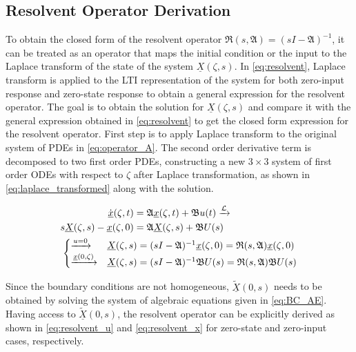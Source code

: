 \subsection{Resolvent Operator Derivation} \label{app:resolvent}
To obtain the closed form of the resolvent operator $\mathfrak{R}(s, \mathfrak{A}) = (sI-\mathfrak{A})^{-1}$, it can be treated as an operator that maps the initial condition or the input to the Laplace transform of the state of the system $\underline{X}(\zeta, s)$. In \eqref{eq:resolvent}, Laplace transform is applied to the LTI representation of the system for both zero-input response and zero-state response to obtain a general expression for the resolvent operator. The goal is to obtain the solution for $\underline{X}(\zeta, s)$ and compare it with the general expression obtained in \eqref{eq:resolvent} to get the closed form expression for the resolvent operator. First step is to apply Laplace transform to the original system of PDEs in \eqref{eq:operator_A}. The second order derivative term is decomposed to two first order PDEs, constructing a new $3 \times 3$ system of first order ODEs with respect to $\zeta$ after Laplace transformation, as shown in \eqref{eq:laplace_transformed} along with the solution.

\begin{equation} \label{eq:resolvent}
    \begin{aligned}
        \dot{\underline{x}}(\zeta, t) &= \mathfrak{A} \underline{x}(\zeta, t) + \mathfrak{B} u(t) \xrightarrow{\mathcal{L}}\\
        s \underline{X}(\zeta,s) - \underline{x}(\zeta,0) &= \mathfrak{A} \underline{X}(\zeta,s) + \mathfrak{B} U(s)\\
        &\hspace{-7.5em
        }\begin{cases}
            \xrightarrow{u = 0} &\underline{X}(\zeta,s) = (sI - \mathfrak{A})^{-1} \underline{x}(\zeta,0) = \mathfrak{R}(s, \mathfrak{A}) \underline{x}(\zeta,0)\\
            \xrightarrow{\underline{x}(0, \zeta)}& \underline{X}(\zeta,s) = (sI - \mathfrak{A})^{-1} \mathfrak{B} U(s) = \mathfrak{R}(s, \mathfrak{A}) \mathfrak{B} U(s)
        \end{cases}
    \end{aligned}
\end{equation}

Since the boundary conditions are not homogeneous, $\underline{\tilde{X}}(0,s)$ needs to be obtained by solving the system of algebraic equations given in \eqref{eq:BC_AE}.
Having access to $\underline{\tilde{X}}(0,s)$, the resolvent operator can be explicitly derived as shown in \eqref{eq:resolvent_u} and \eqref{eq:resolvent_x} for zero-state and zero-input cases, respectively.

